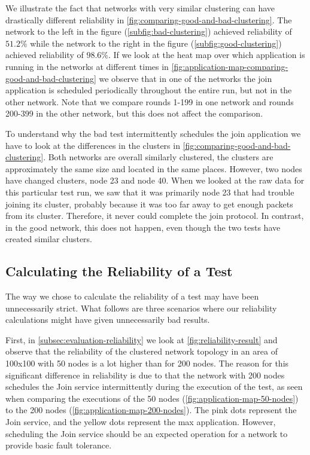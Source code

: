 We illustrate the fact that networks with very similar clustering can have drastically different reliability in \cref{fig:comparing-good-and-bad-clustering}. The network to the left in the figure (\cref{subfig:bad-clustering}) achieved reliability of $51.2\%$ while the network to the right in the figure (\cref{subfig:good-clustering}) achieved reliability of $98.6\%$. If we look at the heat map over which application is running in the networks at different times in \cref{fig:application-map-comparing-good-and-bad-clustering} we observe that in one of the networks the join application is scheduled periodically throughout the entire run, but not in the other network. Note that we compare rounds 1-199 in one network and rounds 200-399 in the other network, but this does not affect the comparison.

To understand why the bad test intermittently schedules the join application we have to look at the differences in the clusters in \cref{fig:comparing-good-and-bad-clustering}. Both networks are overall similarly clustered, the clusters are approximately the same size and located in the same places. However, two nodes have changed clusters, node 23 and node 40. When we looked at the raw data for this particular test run, we saw that it was primarily node 23 that had trouble joining its cluster, probably because it was too far away to get enough packets from its cluster. Therefore, it never could complete the join protocol. In contrast, in the good network, this does not happen, even though the two tests have created similar clusters.

\subsection{Calculating the Reliability of a Test}
The way we chose to calculate the reliability of a test may have been unnecessarily strict. What follows are three scenarios where our reliability calculations might have given unnecessarily bad results.

First, in \cref{subsec:evaluation-reliability} we look at \cref{fig:reliability-result} and observe that the reliability of the clustered network topology in an area of 100x100 with 50 nodes is a lot higher than for 200 nodes. The reason for this significant difference in reliability is due to that the network with 200 nodes schedules the Join service intermittently during the execution of the test, as seen when comparing the executions of the 50 nodes (\cref{fig:application-map-50-nodes}) to the 200 nodes (\cref{fig:application-map-200-nodes}). The pink dots represent the Join service, and the yellow dots represent the max application. However, scheduling the Join service should be an expected operation for a network to provide basic fault tolerance. 
\newpage

